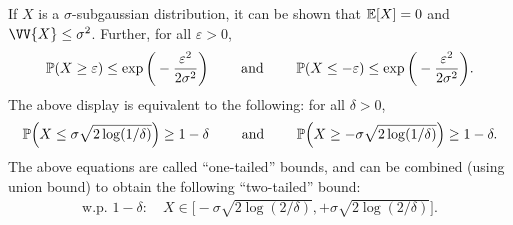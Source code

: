 \documentclass[twoside]{article}
\begin{document}
    If $X$ is a $\sigma$-subgaussian distribution, it can be shown that $\mathbb{E}[X] = 0$ and $\VV{X} \leq \sigma^2$. Further, for all $\varepsilon > 0$,
    \begin{align*}
      \mathbb{P}(X \geq \varepsilon) \leq \exp \bigg( -\frac{\varepsilon^2}{2 \sigma^2} \bigg) \qquad \text{ and } \qquad \mathbb{P}(X \leq - \varepsilon) \leq \exp \bigg( -\frac{\varepsilon^2}{2 \sigma^2} \bigg).
    \end{align*}
    The above display is equivalent to the following: for all $\delta > 0$,
    \begin{align*}
      \mathbb{P} \Big(X \leq \sigma \sqrt{2 \log (1 / \delta)} \Big) \geq 1 - \delta \qquad \text{ and } \qquad \mathbb{P} \Big(X \geq - \sigma \sqrt{2 \log (1 / \delta)} \Big) \geq 1 - \delta.
    \end{align*}
    The above equations are called ``one-tailed'' bounds, and can be combined (using union bound) to obtain the following ``two-tailed'' bound: 
    \begin{align}
      \text{w.p. } 1 - \delta: \quad X \in \Big[ - \sigma \sqrt{2 \log (2 / \delta)}, + \sigma \sqrt{2 \log (2 / \delta)} \Big]. \label{eq: two_tailed_SG}
    \end{align}
    
\end{document}
